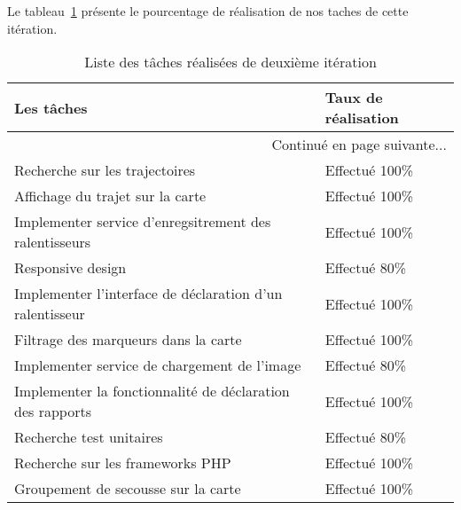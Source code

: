 Le tableau~\ref{tab:sprint2-evaluation} présente le pourcentage de
réalisation de nos taches de cette itération.
\begin{center}
    \begin{longtable}{| l | l |}
        \caption{Liste des tâches réalisées de deuxième itération }
        \label{tab:sprint2-evaluation} \\

        \hline
        \textbf{Les tâches} & \textbf{Taux de réalisation} \\ \hline
        \endhead

        \hline \multicolumn{2}{|r|}{{Continué en page suivante$\dotsc$}} \\ \hline
        \endfoot

        \hline \hline
        \endlastfoot

        \hline
Recherche sur les trajectoires & Effectué 100\% \\ \hline
Affichage du trajet sur la carte & Effectué 100\% \\ \hline
Implementer service d’enregsitrement des ralentisseurs & Effectué 100\% \\ \hline
Responsive design & Effectué 80\% \\ \hline
Implementer l’interface de déclaration d'un ralentisseur & Effectué 100\% \\ \hline
Filtrage des marqueurs dans la carte & Effectué 100\% \\ \hline
Implementer service de chargement de l'image & Effectué 80\% \\ \hline
Implementer la fonctionnalité de déclaration des rapports & Effectué 100\% \\ \hline
Recherche test unitaires & Effectué 80\% \\ \hline
Recherche sur les frameworks PHP & Effectué 100\% \\ \hline
Groupement de secousse sur la carte & Effectué 100\% \\ \hline
    \end{longtable}
\end{center}
